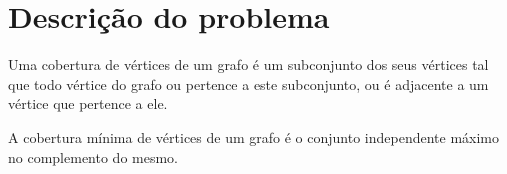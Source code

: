 \part{Descrição do problema}
\label{part:descricao}

Uma cobertura de vértices de um grafo é um subconjunto dos seus
vértices tal que todo vértice do grafo ou pertence a este subconjunto,
ou é adjacente a um vértice que pertence a ele.

A cobertura mínima de vértices de um grafo é o conjunto independente
máximo no complemento do mesmo.







